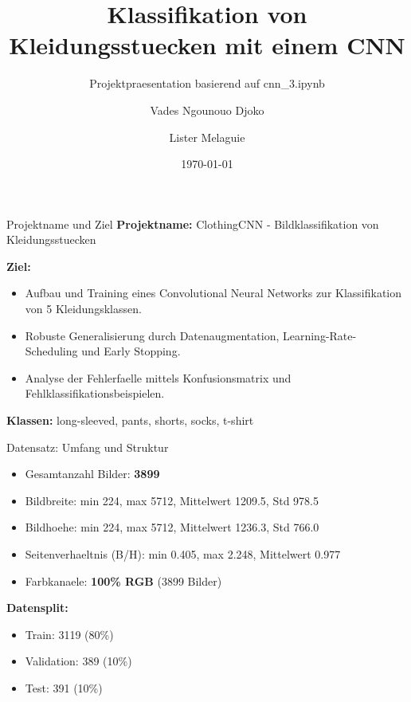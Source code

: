 \documentclass{beamer}
\title{Klassifikation von Kleidungsstuecken mit einem CNN}
\subtitle{Projektpraesentation basierend auf cnn\_3.ipynb}
\author{Vades Ngounouo Djoko \and Lister Melaguie}
\institute{Deep Learning}
\date{\today}
\begin{document}
\begin{frame}
    \titlepage
\end{frame}

\begin{frame}{Projektname und Ziel}
\textbf{Projektname:} ClothingCNN - Bildklassifikation von Kleidungsstuecken

\vspace{0.5em}
\textbf{Ziel:}
\begin{itemize}
    \item Aufbau und Training eines Convolutional Neural Networks zur Klassifikation von 5 Kleidungsklassen.
    \item Robuste Generalisierung durch Datenaugmentation, Learning-Rate-Scheduling und Early Stopping.
    \item Analyse der Fehlerfaelle mittels Konfusionsmatrix und Fehlklassifikationsbeispielen.
\end{itemize}

\vspace{0.5em}
\textbf{Klassen:} long-sleeved, pants, shorts, socks, t-shirt
\end{frame}

\begin{frame}{Datensatz: Umfang und Struktur}
\begin{itemize}
    \item Gesamtanzahl Bilder: \textbf{3899}
    \item Bildbreite: min 224, max 5712, Mittelwert 1209.5, Std 978.5
    \item Bildhoehe: min 224, max 5712, Mittelwert 1236.3, Std 766.0
    \item Seitenverhaeltnis (B/H): min 0.405, max 2.248, Mittelwert 0.977
    \item Farbkanaele: \textbf{100\% RGB} (3899 Bilder)
\end{itemize}

\vspace{0.4em}
\textbf{Datensplit:}
\begin{itemize}
    \item Train: 3119 (80\%)
    \item Validation: 389 (10\%)
    \item Test: 391 (10\%)
\end{itemize}

\end{frame}
\end{document}
